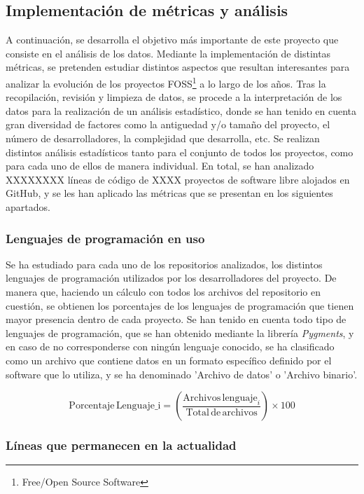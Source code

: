\documentclass[a4paper, 12pt]{book}
\begin{document}
\subsection{Implementación de métricas y análisis}
\label{subsec:metricas}

A continuación, se desarrolla el objetivo más importante de este proyecto que consiste en el análisis de los datos. Mediante la implementación de distintas métricas, se pretenden estudiar distintos aspectos que resultan interesantes para analizar la evolución de los proyectos
FOSS\footnote{Free/Open Source Software} a lo largo de los años.
Tras la recopilación, revisión y limpieza de datos, se procede a la interpretación de los datos para la realización de un análisis estadístico, donde se han tenido en cuenta gran diversidad de factores como la antiguedad y/o tamaño del proyecto, el número de desarrolladores, la
complejidad que desarrolla, etc. Se realizan distintos análisis estadísticos tanto para el conjunto de todos los proyectos, como para cada uno de ellos de manera individual.
En total, se han analizado XXXXXXXX líneas de código de XXXX proyectos de software libre alojados en GitHub, y se les han aplicado las métricas que se presentan en los siguientes apartados.

\subsubsection{Lenguajes de programación en uso}
\label{subsubsec:lenguajes}

Se ha estudiado para cada uno de los repositorios analizados, los distintos lenguajes de programación utilizados por los desarrolladores del proyecto. De manera que, haciendo un cálculo con todos los archivos del repositorio en cuestión, se obtienen los porcentajes de los lenguajes
de programación que tienen mayor presencia dentro de cada proyecto. Se han tenido en cuenta todo tipo de lenguajes de programación, que se han obtenido mediante la librería \textit{Pygments},  y en caso de no corresponderse
con ningún lenguaje conocido, se ha clasificado como un archivo que contiene datos en un formato específico definido por el software que lo utiliza, y se ha denominado 'Archivo de datos' o 'Archivo binario'.

\[\text{Porcentaje} \, \text{Lenguaje_i} = \left( \frac{\text{Archivos} \, \text{lenguaje}_i}{\text{Total} \, \text{de} \, \text{archivos}} \right) \times 100\]

\subsubsection{Líneas que permanecen en la actualidad}
\label{subsubsec:lineas-vivas}
\end{document}
